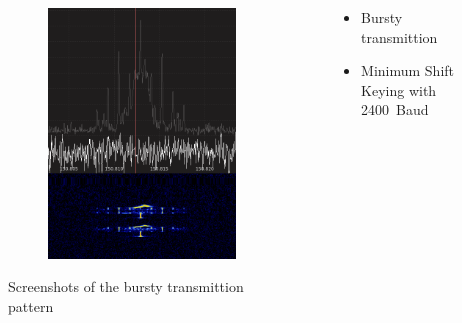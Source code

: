 \begin{frame}
\begin{columns}
\begin{figure}
\begin{subfigure}[b]{0.46\textwidth}
	\includegraphics[height=0.65\textheight,width=\textwidth]{figs/spectrum_dresden_cropped.png}
\end{subfigure}
\caption{Screenshots of the bursty transmittion pattern}
\end{figure}
\begin{itemize}
	\item Bursty transmittion
	\item Minimum Shift Keying with \SI{2400}{Baud}
\end{itemize}
\end{columns}
\end{frame}


